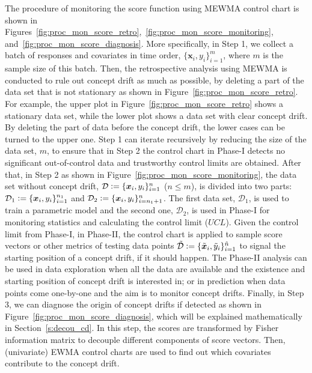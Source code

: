 \documentclass[twoside,11pt]{article}
\begin{document}
The procedure of monitoring the score function using MEWMA control chart is shown in Figures~\ref{fig:proc_mon_score_retro},~\ref{fig:proc_mon_score_monitoring}, and~\ref{fig:proc_mon_score_diagnosis}. More specifically, in Step 1, we collect a batch of responses and covariates in time order, $\{\bm {x}_i, y_i\} _{i=1} ^{m}$, where $m$ is the sample size of this batch. Then, the retrospective analysis using MEWMA is conducted to rule out concept drift as much as possible, by deleting a part of the data set that is not stationary as shown in Figure~\ref{fig:proc_mon_score_retro}. For example, the upper plot in Figure~\ref{fig:proc_mon_score_retro} shows a stationary data set, while the lower plot shows a data set with clear concept drift. By deleting the part of data before the concept drift, the lower cases can be turned to the upper one. Step 1 can iterate recursively by reducing the size of the data set, $m$, to ensure that in Step 2 the control chart in Phase-I detects no significant out-of-control data and trustworthy control limits are obtained. After that, in Step 2 as shown in Figure~\ref{fig:proc_mon_score_monitoring}, the data set without concept drift, $\mathcal{D} \vcentcolon=\{\bm {x}_i, y_i\} _{i=1} ^{n}$ ($n\leq m$), is divided into two parts: $ \mathcal{D}_1 \vcentcolon= \{\bm {x}_i, y_i\} _{i=1} ^{n_1}$ and $\mathcal{D}_2 \vcentcolon= \{\bm {x}_i, y_i\} _{i=n_1+1} ^{n}$. The first data set, $\mathcal{D}_1$, is used to train a parametric model and the second one, $\mathcal{D}_2$, is used in Phase-I for monitoring statistics and calculating the control limit ($UCL$). Given the control limit from Phase-I, in Phase-II, the control chart is applied to sample score vectors or other metrics of testing data points $\tilde{\mathcal{D}}\vcentcolon=\{\tilde{\bm{x}}_i,\tilde{y}_i\}_{i = 1}^{\tilde{n}}$ to signal the starting position of a concept drift, if it should happen. The Phase-II analysis can be used in data exploration when all the data are available and the existence and starting position of concept drift is interested in; or in prediction when data points come one-by-one and the aim is to monitor concept drifts. Finally, in Step 3, we can diagnose the origin of concept drifts if detected as shown in Figure~\ref{fig:proc_mon_score_diagnosis}, which will be explained mathematically in Section~\ref{s:decou_cd}. In this step, the scores are transformed by Fisher information matrix to decouple different components of score vectors. Then, (univariate) EWMA control charts are used to find out which covariates contribute to the concept drift.
 
\end{document}
